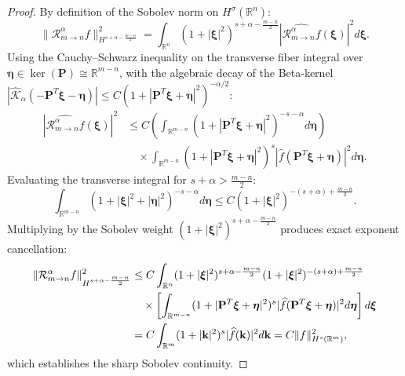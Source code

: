\documentclass[11pt,a4paper]{article}
\theoremstyle{plain}
\theoremstyle{definition}
\theoremstyle{remark}
\numberwithin{equation}{section}
\begin{document}
\begin{proof}
By definition of the Sobolev norm on $H^\sigma(\mathbb{R}^n)$:
\begin{equation}
\|\mathcal{R}_{m \to n}^\alpha f\|_{H^{s + \alpha - \frac{m-n}{2}}}^2 = \int_{\mathbb{R}^n} (1 + |\boldsymbol{\xi}|^2)^{s + \alpha - \frac{m-n}{2}} |\widehat{\mathcal{R}_{m \to n}^\alpha f}(\boldsymbol{\xi})|^2 d\boldsymbol{\xi}.
\end{equation}
Using the Cauchy--Schwarz inequality on the transverse fiber integral over $\boldsymbol{\eta} \in \operatorname{ker}(\mathbf{P}) \cong \mathbb{R}^{m-n}$, with the algebraic decay of the Beta-kernel $|\widehat{\mathcal{K}}_\alpha(-\mathbf{P}^T\boldsymbol{\xi} - \boldsymbol{\eta})| \le C(1 + |\mathbf{P}^T\boldsymbol{\xi} + \boldsymbol{\eta}|^2)^{-\alpha/2}$:
\begin{align*}
\left|\widehat{\mathcal{R}_{m \to n}^\alpha f}(\boldsymbol{\xi})\right|^2 &\le C \left(\int_{\mathbb{R}^{m-n}} (1 + |\mathbf{P}^T\boldsymbol{\xi} + \boldsymbol{\eta}|^2)^{-s - \alpha} d\boldsymbol{\eta}\right) \\
&\quad \times \int_{\mathbb{R}^{m-n}} (1 + |\mathbf{P}^T\boldsymbol{\xi} + \boldsymbol{\eta}|^2)^s |\widehat{f}(\mathbf{P}^T\boldsymbol{\xi} + \boldsymbol{\eta})|^2 d\boldsymbol{\eta}.
\end{align*}
Evaluating the transverse integral for $s + \alpha > \frac{m-n}{2}$:
\begin{equation}
\int_{\mathbb{R}^{m-n}} (1 + |\boldsymbol{\xi}|^2 + |\boldsymbol{\eta}|^2)^{-s - \alpha} d\boldsymbol{\eta} \le C (1 + |\boldsymbol{\xi}|^2)^{-(s + \alpha) + \frac{m-n}{2}}.
\end{equation}
Multiplying by the Sobolev weight $(1 + |\boldsymbol{\xi}|^2)^{s + \alpha - \frac{m-n}{2}}$ produces exact exponent cancellation:
\begin{align*}
\|\mathcal{R}_{m \to n}^\alpha f\|_{H^{s+\alpha-\frac{m-n}{2}}}^2 
&\le C \int_{\mathbb{R}^n} (1+|\boldsymbol{\xi}|^2)^{s+\alpha-\frac{m-n}{2}} (1+|\boldsymbol{\xi}|^2)^{-(s+\alpha)+\frac{m-n}{2}} \notag \\
&\quad \times \left[\int_{\mathbb{R}^{m-n}} (1+|\mathbf{P}^T\boldsymbol{\xi}+\boldsymbol{\eta}|^2)^s |\widehat{f}(\mathbf{P}^T\boldsymbol{\xi}+\boldsymbol{\eta})|^2 d\boldsymbol{\eta}\right] d\boldsymbol{\xi} \\
&= C \int_{\mathbb{R}^m} (1 + |\mathbf{k}|^2)^s |\widehat{f}(\mathbf{k})|^2 d\mathbf{k} = C \|f\|_{H^s(\mathbb{R}^m)}^2,
\end{align*}
which establishes the sharp Sobolev continuity.
\end{proof}
\end{document}
